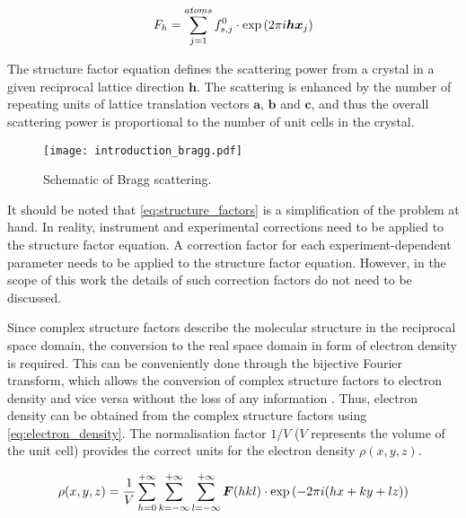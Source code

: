 \begin{equation}
    F_h=\sum_{j=1}^{atoms}f_{s,j}^0 \cdot \exp\left(2\pi\\i\boldsymbol{h}\boldsymbol{x}_j\right)
    \label{eq:structure_factors}
\end{equation}

The structure factor equation defines the scattering power from a crystal in a given reciprocal lattice direction $\boldsymbol{h}$. The scattering is enhanced by the number of repeating units of lattice translation vectors $\boldsymbol{a}$, $\boldsymbol{b}$ and $\boldsymbol{c}$, and thus the overall scattering power is proportional to the number of unit cells in the crystal.

\begin{figure}[H]
    \centering
    \texttt{[image: introduction\_bragg.pdf]}
    \caption[Schematic of Bragg scattering]{Schematic of Bragg scattering.}
    \label{fig:introduction_bragg}
\end{figure}

It should be noted that \cref{eq:structure_factors} is a simplification of the problem at hand. In reality, instrument and experimental corrections need to be applied to the structure factor equation. A correction factor for each experiment-dependent parameter needs to be applied to the structure factor equation. However, in the scope of this work the details of such correction factors do not need to be discussed.

Since complex structure factors describe the molecular structure in the reciprocal space domain, the conversion to the real space domain in form of electron density is required. This can be conveniently done through the bijective Fourier transform, which allows the conversion of complex structure factors to electron density and vice versa without the loss of any information \cite{Rupp2010-nc}. Thus, electron density can be obtained from the complex structure factors using \cref{eq:electron_density}. The normalisation factor $1/V$ ($V$ represents the volume of the unit cell) provides the correct units for the electron density $\rho(x,y,z)$.

\begin{equation}
    \rho(x,y,z)=\frac{1}{V}\sum_{h=0}^{+\infty}\sum_{k=-\infty}^{+\infty}\sum_{l=-\infty}^{+\infty}\boldsymbol{F}(hkl)\cdot \exp\left(-2\pi\\i(hx+ky+lz)\right)
    \label{eq:electron_density}
\end{equation}

